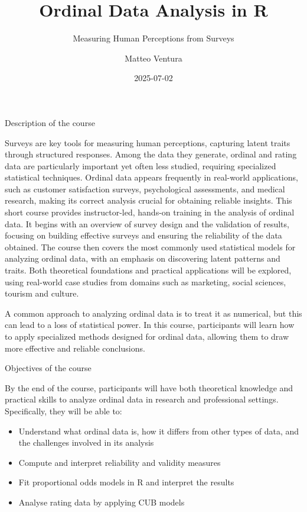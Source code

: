 \documentclass[
  letterpaper,
  DIV=11,
  numbers=noendperiod]{scrartcl}
\title{Ordinal Data Analysis in R}
\subtitle{Measuring Human Perceptions from Surveys}
\author{Matteo Ventura}
\date{2025-07-02}
\providecommand{\tightlist}{%
  \setlength{\itemsep}{0pt}\setlength{\parskip}{0pt}}\usepackage{longtable,booktabs,array}
\begin{document}
\maketitle
\ifdefined\Shaded\renewenvironment{Shaded}{\begin{tcolorbox}[interior hidden, borderline west={3pt}{0pt}{shadecolor}, boxrule=0pt, sharp corners, enhanced, breakable, frame hidden]}{\end{tcolorbox}}\fi

Description of the course

Surveys are key tools for measuring human perceptions, capturing latent
traits through structured responses. Among the data they generate,
ordinal and rating data are particularly important yet often less
studied, requiring specialized statistical techniques. Ordinal data
appears frequently in real-world applications, such as customer
satisfaction surveys, psychological assessments, and medical research,
making its correct analysis crucial for obtaining reliable insights.
This short course provides instructor-led, hands-on training in the
analysis of ordinal data. It begins with an overview of survey design
and the validation of results, focusing on building effective surveys
and ensuring the reliability of the data obtained. The course then
covers the most commonly used statistical models for analyzing ordinal
data, with an emphasis on discovering latent patterns and traits. Both
theoretical foundations and practical applications will be explored,
using real-world case studies from domains such as marketing, social
sciences, tourism and culture.

A common approach to analyzing ordinal data is to treat it as numerical,
but this can lead to a loss of statistical power. In this course,
participants will learn how to apply specialized methods designed for
ordinal data, allowing them to draw more effective and reliable
conclusions.

Objectives of the course

By the end of the course, participants will have both theoretical
knowledge and practical skills to analyze ordinal data in research and
professional settings. Specifically, they will be able to:

\begin{itemize}
\tightlist
\item
  Understand what ordinal data is, how it differs from other types of
  data, and the challenges involved in its analysis
\item
  Compute and interpret reliability and validity measures
\item
  Fit proportional odds models in R and interpret the results
\item
  Analyse rating data by applying CUB models
\end{itemize}
\end{document}
